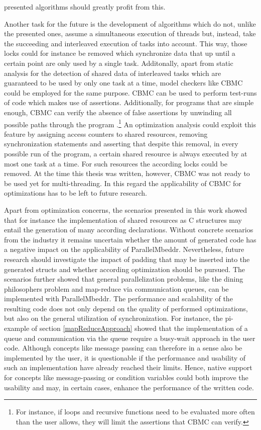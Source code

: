 presented algorithms should greatly profit from this.

Another task for the future is the development of algorithms which do not, unlike the presented ones, assume a simultaneous execution of threads but, instead, take the succeeding and interleaved execution of tasks into account. This way, those locks could for instance be removed which synchronize data that up until a certain point are only used by a single task. Additonally, apart from static analysis for the detection of shared data of interleaved tasks which are guaranteed to be used by only one task at a time, model checkers like CBMC could be employed for the same purpose. CBMC can be used to perform test-runs of code which makes use of assertions. Additionally, for programs that are simple enough, CBMC can verify the absence of false assertions by unwinding all possible paths through the program \cite{CBMCTutorial}.\footnote{For instance, if loops and recursive functions need to be evaluated more often than the user allows, they will limit the assertions that CBMC can verify.} An optimization analysis could exploit this feature by assigning access counters to shared resources, removing synchronization statements and asserting that despite this removal, in every possible run of the program, a certain shared resource is always executed by at most one task at a time. For such resources the according locks could be removed. At the time this thesis was written, however, CBMC was not ready to be used yet for multi-threading. In this regard the applicability of CBMC for optimizations has to be left to future research.

Apart from optimization concerns, the scenarios presented in this work showed that for instance the implementation of shared resources as C structures may entail the generation of many according declarations. Without concrete scenarios from the industry it remains uncertain whether the amount of generated code has a negative impact on the applicability of ParallelMbeddr. Nevertheless, future research should investigate the impact of padding that may be inserted into the generated structs and whether according optimization should be pursued. The scenarios further showed that general parallelization problems, like the dining philosophers problem and map-reduce via communication queues, can be implemented with ParallelMbeddr. The performance and scalability of the resulting code does not only depend on the quality of performed optimizations, but also on the general utilization of synchronization. For instance, the pi-example of section \ref{mapReduceApproach} showed that the implementation of a queue and communication via the queue require a busy-wait approach in the user code. Although concepts like message passing can therefore in a sense also be implemented by the user, it is questionable if the performance and usability of such an implementation have already reached their limits. Hence, native support for concepts like message-passing or condition variables could both improve the usability and may, in certain cases, enhance the performance of the written code.


